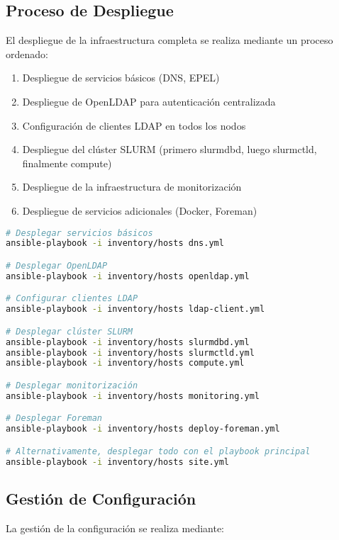\documentclass[12pt,a4paper]{article}
\begin{document}
\subsection{Proceso de Despliegue}

El despliegue de la infraestructura completa se realiza mediante un proceso ordenado:

\begin{enumerate}[leftmargin=*]
    \item Despliegue de servicios básicos (DNS, EPEL)
    \item Despliegue de OpenLDAP para autenticación centralizada
    \item Configuración de clientes LDAP en todos los nodos
    \item Despliegue del clúster SLURM (primero slurmdbd, luego slurmctld, finalmente compute)
    \item Despliegue de la infraestructura de monitorización
    \item Despliegue de servicios adicionales (Docker, Foreman)
\end{enumerate}

\begin{lstlisting}[language=bash, caption=Comandos para el despliegue]
# Desplegar servicios básicos
ansible-playbook -i inventory/hosts dns.yml

# Desplegar OpenLDAP
ansible-playbook -i inventory/hosts openldap.yml

# Configurar clientes LDAP
ansible-playbook -i inventory/hosts ldap-client.yml

# Desplegar clúster SLURM
ansible-playbook -i inventory/hosts slurmdbd.yml
ansible-playbook -i inventory/hosts slurmctld.yml
ansible-playbook -i inventory/hosts compute.yml

# Desplegar monitorización
ansible-playbook -i inventory/hosts monitoring.yml

# Desplegar Foreman
ansible-playbook -i inventory/hosts deploy-foreman.yml

# Alternativamente, desplegar todo con el playbook principal
ansible-playbook -i inventory/hosts site.yml
\end{lstlisting}

\subsection{Gestión de Configuración}

La gestión de la configuración se realiza mediante:
\end{document}
